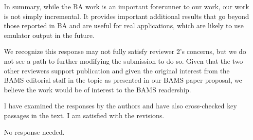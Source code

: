\documentclass[12pt,english]{reviewresponse}
\begin{document}
\begin{revresponse}
In summary,  while the BA work is an important forerunner to our work, our work is not simply incremental. It provides important additional results that go beyond those reported in BA and are useful for real applications, which are likely to use emulator output in the future. 

We recognize this response may not fully satisfy reviewer 2's concerns, but we do not 
see a path to further modifying the submission to do so.
Given that the two other reviewers support publication and given the original interest from the BAMS editorial staff in the topic as presented in our BAMS paper proposal, we believe the work would be of interest to the BAMS readership.



\end{revresponse}

\reviewer 
\begin{revcomment}
I have examined the responses by the authors and have also cross-checked key passages in the text.  I am satisfied with the revisions.

\end{revcomment}

\begin{revresponse}
No response needed.
\end{revresponse}
\end{document}
